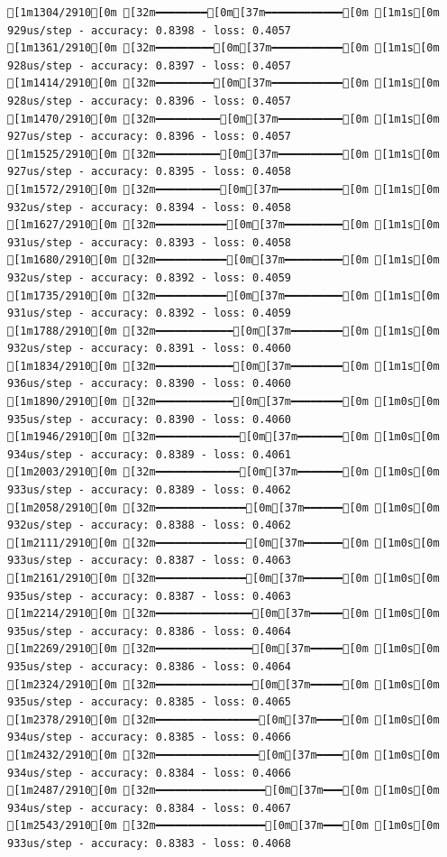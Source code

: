 \documentclass[
  letterpaper,
  DIV=11,
  numbers=noendperiod]{scrartcl}
\begin{document}
\begin{verbatim}
[1m1304/2910[0m [32m━━━━━━━━[0m[37m━━━━━━━━━━━━[0m [1m1s[0m 929us/step - accuracy: 0.8398 - loss: 0.4057
[1m1361/2910[0m [32m━━━━━━━━━[0m[37m━━━━━━━━━━━[0m [1m1s[0m 928us/step - accuracy: 0.8397 - loss: 0.4057
[1m1414/2910[0m [32m━━━━━━━━━[0m[37m━━━━━━━━━━━[0m [1m1s[0m 928us/step - accuracy: 0.8396 - loss: 0.4057
[1m1470/2910[0m [32m━━━━━━━━━━[0m[37m━━━━━━━━━━[0m [1m1s[0m 927us/step - accuracy: 0.8396 - loss: 0.4057
[1m1525/2910[0m [32m━━━━━━━━━━[0m[37m━━━━━━━━━━[0m [1m1s[0m 927us/step - accuracy: 0.8395 - loss: 0.4058
[1m1572/2910[0m [32m━━━━━━━━━━[0m[37m━━━━━━━━━━[0m [1m1s[0m 932us/step - accuracy: 0.8394 - loss: 0.4058
[1m1627/2910[0m [32m━━━━━━━━━━━[0m[37m━━━━━━━━━[0m [1m1s[0m 931us/step - accuracy: 0.8393 - loss: 0.4058
[1m1680/2910[0m [32m━━━━━━━━━━━[0m[37m━━━━━━━━━[0m [1m1s[0m 932us/step - accuracy: 0.8392 - loss: 0.4059
[1m1735/2910[0m [32m━━━━━━━━━━━[0m[37m━━━━━━━━━[0m [1m1s[0m 931us/step - accuracy: 0.8392 - loss: 0.4059
[1m1788/2910[0m [32m━━━━━━━━━━━━[0m[37m━━━━━━━━[0m [1m1s[0m 932us/step - accuracy: 0.8391 - loss: 0.4060
[1m1834/2910[0m [32m━━━━━━━━━━━━[0m[37m━━━━━━━━[0m [1m1s[0m 936us/step - accuracy: 0.8390 - loss: 0.4060
[1m1890/2910[0m [32m━━━━━━━━━━━━[0m[37m━━━━━━━━[0m [1m0s[0m 935us/step - accuracy: 0.8390 - loss: 0.4060
[1m1946/2910[0m [32m━━━━━━━━━━━━━[0m[37m━━━━━━━[0m [1m0s[0m 934us/step - accuracy: 0.8389 - loss: 0.4061
[1m2003/2910[0m [32m━━━━━━━━━━━━━[0m[37m━━━━━━━[0m [1m0s[0m 933us/step - accuracy: 0.8389 - loss: 0.4062
[1m2058/2910[0m [32m━━━━━━━━━━━━━━[0m[37m━━━━━━[0m [1m0s[0m 932us/step - accuracy: 0.8388 - loss: 0.4062
[1m2111/2910[0m [32m━━━━━━━━━━━━━━[0m[37m━━━━━━[0m [1m0s[0m 933us/step - accuracy: 0.8387 - loss: 0.4063
[1m2161/2910[0m [32m━━━━━━━━━━━━━━[0m[37m━━━━━━[0m [1m0s[0m 935us/step - accuracy: 0.8387 - loss: 0.4063
[1m2214/2910[0m [32m━━━━━━━━━━━━━━━[0m[37m━━━━━[0m [1m0s[0m 935us/step - accuracy: 0.8386 - loss: 0.4064
[1m2269/2910[0m [32m━━━━━━━━━━━━━━━[0m[37m━━━━━[0m [1m0s[0m 935us/step - accuracy: 0.8386 - loss: 0.4064
[1m2324/2910[0m [32m━━━━━━━━━━━━━━━[0m[37m━━━━━[0m [1m0s[0m 935us/step - accuracy: 0.8385 - loss: 0.4065
[1m2378/2910[0m [32m━━━━━━━━━━━━━━━━[0m[37m━━━━[0m [1m0s[0m 934us/step - accuracy: 0.8385 - loss: 0.4066
[1m2432/2910[0m [32m━━━━━━━━━━━━━━━━[0m[37m━━━━[0m [1m0s[0m 934us/step - accuracy: 0.8384 - loss: 0.4066
[1m2487/2910[0m [32m━━━━━━━━━━━━━━━━━[0m[37m━━━[0m [1m0s[0m 934us/step - accuracy: 0.8384 - loss: 0.4067
[1m2543/2910[0m [32m━━━━━━━━━━━━━━━━━[0m[37m━━━[0m [1m0s[0m 933us/step - accuracy: 0.8383 - loss: 0.4068

\end{verbatim}
\end{document}
